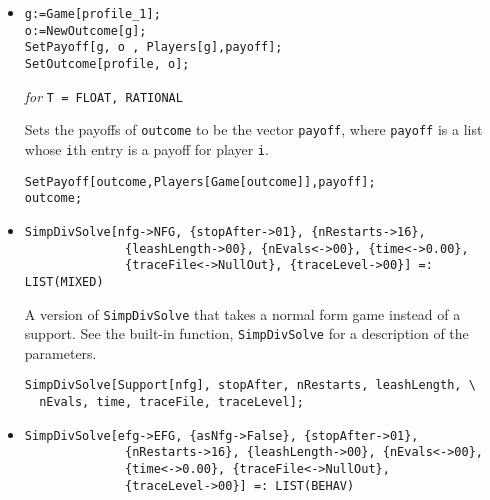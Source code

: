 \begin{itemize}
{\it for} {\tt T = FLOAT, RATIONAL} 
\bd 
Sets the payoffs of a normal form game at the pure strategy profile
\verb+profile+ to be the vector \verb+payoff+.  \verb+profile+ must be
a list of strategies, whose \verb+i+th entry is a strategy for player
\verb+i+, and \verb+payoff+ is a list whose \verb+i+th
entry is a payoff for player \verb+i+.
\begin{verbatim}
SetPayoff[profile,Players[Game[profile]],payoff];
\end{verbatim} 
\ed

\item{}
\protect \large \begin{verbatim}
g:=Game[profile_1];
o:=NewOutcome[g];
SetPayoff[g, o , Players[g],payoff];
SetOutcome[profile, o];
\end{verbatim}\normalsize
 
{\it for} {\tt T = FLOAT, RATIONAL}
\bd 

Sets the payoffs of \verb+outcome+ to be the vector \verb+payoff+,
where \verb+payoff+ is a list whose \verb+i+th entry is a payoff for
player \verb+i+.
\begin{verbatim}
SetPayoff[outcome,Players[Game[outcome]],payoff];
outcome;
\end{verbatim} 
\ed

\item{}
\protect \large \begin{verbatim}
SimpDivSolve[nfg->NFG, {stopAfter->01}, {nRestarts->16}, 
              {leashLength->00}, {nEvals<->00}, {time<->0.00}, 
              {traceFile<->NullOut}, {traceLevel->00}] =: LIST(MIXED)
\end{verbatim}\normalsize

\bd 
A version of \verb+SimpDivSolve+ that takes a normal form
game instead of a support.  See the built-in function,
\verb+SimpDivSolve+ for a description of the parameters.
\begin{verbatim}
SimpDivSolve[Support[nfg], stopAfter, nRestarts, leashLength, \
  nEvals, time, traceFile, traceLevel];
\end{verbatim} 
\ed

\item{}
\protect \large \begin{verbatim}
SimpDivSolve[efg->EFG, {asNfg->False}, {stopAfter->01}, 
              {nRestarts->16}, {leashLength->00}, {nEvals<->00}, 
              {time<->0.00}, {traceFile<->NullOut}, 
              {traceLevel->00}] =: LIST(BEHAV)
\end{verbatim}\normalsize


\end{itemize}
